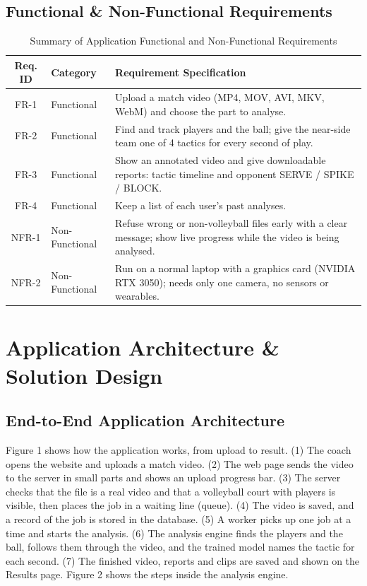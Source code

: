 \documentclass[11pt, a4paper]{article}
\begin{document}
\subsection{Functional \& Non-Functional Requirements}
\begin{table}[H]
    \centering
    \footnotesize
    \renewcommand{\arraystretch}{1.25}
    \begin{tabular}{|c|p{3.0cm}|p{9.2cm}|}
        \hline
        \textbf{Req. ID} & \textbf{Category} & \textbf{Requirement Specification} \\
        \hline
        FR-1 & Functional & Upload a match video (MP4, MOV, AVI, MKV, WebM) and choose the part to analyse. \\
        \hline
        FR-2 & Functional & Find and track players and the ball; give the near-side team one of 4 tactics for every second of play. \\
        \hline
        FR-3 & Functional & Show an annotated video and give downloadable reports: tactic timeline and opponent SERVE / SPIKE / BLOCK. \\
        \hline
        FR-4 & Functional & Keep a list of each user's past analyses. \\
        \hline
        NFR-1 & Non-Functional & Refuse wrong or non-volleyball files early with a clear message; show live progress while the video is being analysed. \\
        \hline
        NFR-2 & Non-Functional & Run on a normal laptop with a graphics card (NVIDIA RTX 3050); needs only one camera, no sensors or wearables. \\
        \hline
    \end{tabular}
    \caption{Summary of Application Functional and Non-Functional Requirements}
\end{table}

\section{Application Architecture \& Solution Design}

\subsection{End-to-End Application Architecture}
\noindent
Figure 1 shows how the application works, from upload to result. (1) The coach opens the website and uploads a match video. (2) The web page sends the video to the server in small parts and shows an upload progress bar. (3) The server checks that the file is a real video and that a volleyball court with players is visible, then places the job in a waiting line (queue). (4) The video is saved, and a record of the job is stored in the database. (5) A worker picks up one job at a time and starts the analysis. (6) The analysis engine finds the players and the ball, follows them through the video, and the trained model names the tactic for each second. (7) The finished video, reports and clips are saved and shown on the Results page. Figure 2 shows the steps inside the analysis engine.
\end{document}
